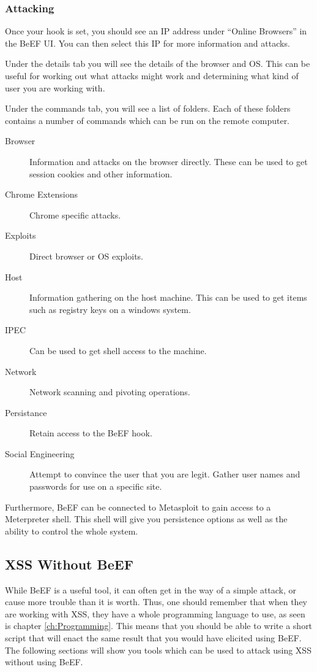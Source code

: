 			\subsubsection{Attacking}
				Once your hook is set, you should see an IP address under ``Online Browsers'' in the BeEF UI. 
				You can then select this IP for more information and attacks. 
				
				Under the details tab you will see the details of the browser and OS. 
				This can be useful for working out what attacks might work and determining what kind of user you are working with. 

				Under the commands tab, you will see a list of folders. 
				Each of these folders contains a number of commands which can be run on the remote computer. 
				\begin{description}
					\item[Browser] Information and attacks on the browser directly. 
						These can be used to get session cookies and other information. 
					\item[Chrome Extensions] Chrome specific attacks. 
					\item[Exploits] Direct browser or OS exploits. 
					\item[Host] Information gathering on the host machine. 
						This can be used to get items such as registry keys on a windows system. 
					\item[IPEC] Can be used to get shell access to the machine. 
					\item[Network] Network scanning and pivoting operations. 
					\item[Persistance] Retain access to the BeEF hook. 
					\item[Social Engineering] Attempt to convince the user that you are legit. 
						Gather user names and passwords for use on a specific site. 
				\end{description}

				Furthermore, BeEF can be connected to Metasploit to gain access to a Meterpreter shell. 
				This shell will give you persistence options as well as the ability to control the whole system. 
		\subsection{XSS Without BeEF}
			While BeEF is a useful tool, it can often get in the way of a simple attack, or cause more trouble than it is worth. 
			Thus, one should remember that when they are working with XSS, they have a whole programming language to use, as seen is chapter \ref{ch:Programming}.
			This means that you should be able to write a short script that will enact the same result that you would have elicited using BeEF. 
			The following sections will show you tools which can be used to attack using XSS without using BeEF. 

